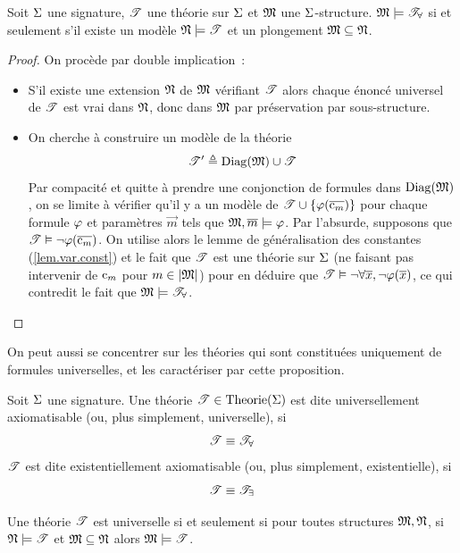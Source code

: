 \begin{proposition}
  Soit $\Sigma$ une signature, $\mathscr T$ une théorie sur $\Sigma$ et $\mathfrak{M}$
  une $\Sigma$-structure.
  $\mathfrak{M}\models\mathscr T_{\forall}$ si et seulement s'il existe un modèle
  $\mathfrak{N}\models\mathscr T$ et un plongement $\mathfrak{M}\subseteq\mathfrak{N}$.
\end{proposition}

\begin{proof}
  On procède par double implication~:
  \begin{itemize}
  \item[\fbox{$\Leftarrow$}] S'il existe une extension $\mathfrak{N}$ de $\mathfrak{M}$
    vérifiant $\mathscr T$ alors chaque énoncé universel de $\mathscr T$ est
    vrai dans $\mathfrak{N}$, donc dans $\mathfrak{M}$ par préservation par sous-structure.
  \item[\fbox{$\Rightarrow$}] On cherche à construire un modèle de la théorie
    \[\mathscr T' \triangleq \operatorname{Diag}(\mathfrak{M}) \cup\mathscr T\]
    Par compacité et quitte à prendre une conjonction de formules dans
    $\operatorname{Diag}(\mathfrak{M})$, on se limite à vérifier qu'il y a un modèle de
    $\mathscr T\cup\{\varphi(\overline{\mathrm{c}_m})\}$ pour chaque formule $\varphi$ et
    paramètres $\vec m$ tels que $\mathfrak{M},\overline{m}\models\varphi$. Par l'absurde,
    supposons que $\mathscr T\vDash\lnot\varphi(\overline{\mathrm{c}_m})$. On utilise alors le lemme
    de généralisation des constantes (\cref{lem.var.const}) et le fait que
    $\mathscr T$ est une théorie sur $\Sigma$ (ne faisant pas intervenir de $\mathrm{c}_m$
    pour $m\in\left\vert \mathfrak{M}\right\vert$) pour en déduire que
    $\mathscr T\vDash\lnot\forall \overline{x}, \lnot\varphi(\overline{x})$, ce qui contredit
    le fait que $\mathfrak{M}\models\mathscr T_{\forall}$.\qedhere
  \end{itemize}
\end{proof}

On peut aussi se concentrer sur les théories qui sont constituées uniquement de
formules universelles, et les caractériser par cette proposition.

\begin{definition}
  Soit $\Sigma$ une signature. Une théorie $\mathscr T\in\operatorname{Theorie}(\Sigma)$ est dite
  universellement axiomatisable (ou, plus simplement, universelle), si
  \[\mathscr T\equiv\mathscr T_{\forall}\]
  $\mathscr T$ est dite existentiellement axiomatisable (ou, plus simplement,
  existentielle), si
  \[\mathscr T\equiv\mathscr T_{\exists}\]
\end{definition}

\begin{corollary}
  Une théorie $\mathscr T$ est universelle si et seulement si pour toutes structures
  $\mathfrak{M},\mathfrak{N}$, si $\mathfrak{N}\models\mathscr T$ et $\mathfrak{M}\subseteq\mathfrak{N}$ alors
  $\mathfrak{M}\models\mathscr T$.
\end{corollary}

